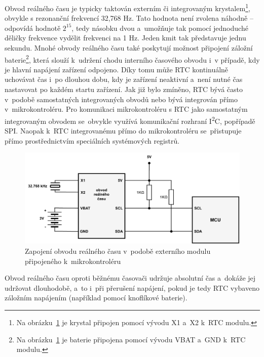 Obvod reálného času je typicky taktován externím či integrovaným krystalem\footnote{Na obrázku~\ref{fig:real-time-circuit} je krystal připojen pomocí vývodu X1 a~X2 k~RTC modulu.}, obvykle s rezonanční frekvencí 32,768 Hz. Tato hodnota není zvolena náhodně – odpovídá hodnotě $2^{15}$, tedy násobku dvou a~umožňuje tak pomocí jednoduché děličky frekvence vydělit frekvenci na 1 Hz. Jeden kmit tak představuje jednu sekundu. Mnohé obvody reálného času také poskytují možnost připojení záložní baterie\footnote{Na obrázku~\ref{fig:real-time-circuit} je baterie připojena pomocí vývodu VBAT a~GND k~RTC modulu.}, která slouží k~udržení chodu interního časového obvodu i~v případě, kdy je hlavní napájení zařízení odpojeno. Díky tomu může RTC kontinuálně uchovávat čas i~po dlouhou dobu, kdy je zařízení neaktivní a~není nutné čas nastavovat po každém startu zařízení. Jak již bylo zmíněno, RTC bývá často v~podobě samostatných integrovaných obvodů nebo bývá integrován přímo v~mikrokontroléru. Pro komunikaci mikrokontroléru s RTC jako samostatným integrovaným obvodem se~obvykle využívá komunikační rozhraní I\textsuperscript{2}C, popřípadě SPI. Naopak k~RTC integrovanému přímo do mikrokontroléru se~přistupuje přímo prostřednictvím speciálních systémových registrů.~\cite{jameco_choosing_right_real_time_clock_chip_or_module, yxc_role_of_32768_freq_in_the_circuit, medium_rtc}

\begin{figure}[h]
    \centering
    \includegraphics[width=1.00\textwidth]{obrazky-figures/real_time_circuit.pdf}
    
    \caption{Zapojení obvodu reálného času v~podobě externího modulu připojeného k~mikrokontroléru~\cite{embed_journal_interfacing_rtc_with_microcontroler}}
    \label{fig:real-time-circuit}
\end{figure}

Obvod reálného času oproti běžnému časovači udržuje absolutní čas a~dokáže jej udržovat dlouhodobě, a~to i~při přerušení napájení, pokud je tedy RTC vybaveno záložním napájením (například pomocí knoflíkové baterie).

